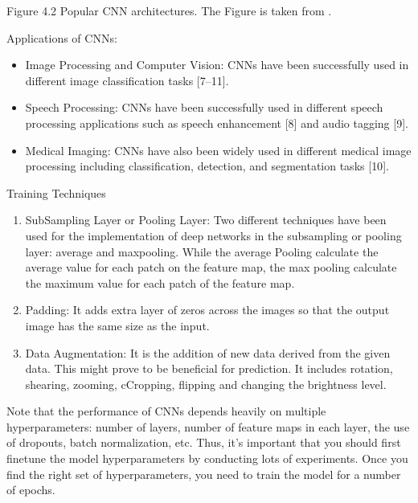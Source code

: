 \documentclass[letterpaper,10pt,english]{jupyterBook}
\begin{document}
\sphinxAtStartPar
Figure 4.2 Popular CNN architectures. The Figure is taken from
.

\sphinxAtStartPar
Applications of CNNs:
\begin{itemize}
\item {} 
\sphinxAtStartPar
Image Processing and Computer Vision: CNNs have been successfully
used in different image classification tasks {[}7–11{]}.

\item {} 
\sphinxAtStartPar
Speech Processing: CNNs have been successfully used in different
speech processing applications such as speech enhancement {[}8{]} and
audio tagging {[}9{]}.

\item {} 
\sphinxAtStartPar
Medical Imaging: CNNs have also been widely used in different
medical image processing including classification, detection, and
segmentation tasks {[}10{]}.

\end{itemize}

\sphinxAtStartPar
Training Techniques
\begin{enumerate}
%
\item {} 
\sphinxAtStartPar
Sub\sphinxhyphen{}Sampling Layer or Pooling Layer:  Two different techniques have
been used for the implementation of deep networks in the
sub\sphinxhyphen{}sampling or pooling layer: average and max\sphinxhyphen{}pooling.  While the
average Pooling calculate the average value for each patch on the
feature map, the max pooling calculate the maximum value for each
patch of the feature map.

\item {} 
\sphinxAtStartPar
Padding: It adds extra layer of zeros across the images so that the
output image has the same size as the input.

\item {} 
\sphinxAtStartPar
Data Augmentation: It is the addition of new data derived from the
given data. This might prove to be beneficial for prediction. It
includes rotation, shearing, zooming, cCropping, flipping and
changing the brightness level.

\end{enumerate}

\sphinxAtStartPar
Note that the performance of CNNs depends heavily on multiple
hyperparameters: number of layers, number of feature maps in each layer,
the use of dropouts, batch normalization, etc. Thus, it’s important that
you should first fine\sphinxhyphen{}tune the model hyperparameters by conducting lots
of experiments. Once you find the right set of hyperparameters, you need
to train the model for a number of epochs.
\end{document}
